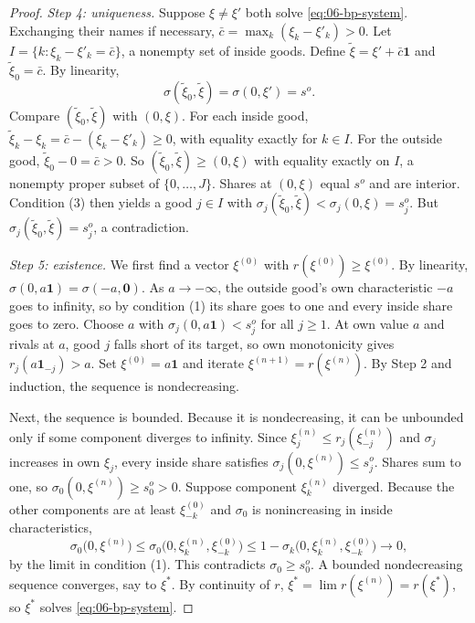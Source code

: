 \begin{proof}
\emph{Step 4: uniqueness.} Suppose $\xi \ne \xi'$ both solve \eqref{eq:06-bp-system}. Exchanging their names if
necessary, $\bar c = \max_k (\xi_k - \xi'_k) > 0$. Let $I = \{k : \xi_k - \xi'_k = \bar c\}$, a nonempty set of inside goods.
Define $\tilde\xi = \xi' + \bar c\mathbf{1}$ and $\tilde\xi_0 = \bar c$. By linearity,
\begin{equation*}
  \sigma(\tilde\xi_0, \tilde\xi) = \sigma(0, \xi') = s^o .
\end{equation*}
Compare $(\tilde\xi_0, \tilde\xi)$ with $(0, \xi)$. For each inside good, $\tilde\xi_k - \xi_k = \bar c - (\xi_k - \xi'_k) \ge
0$, with equality exactly for $k \in I$. For the outside good, $\tilde\xi_0 - 0 = \bar c > 0$. So $(\tilde\xi_0, \tilde\xi) \ge
(0, \xi)$ with equality exactly on $I$, a nonempty proper subset of $\{0, \dots, J\}$. Shares at $(0, \xi)$ equal $s^o$ and are
interior. Condition (3) then yields a good $j \in I$ with $\sigma_j(\tilde\xi_0, \tilde\xi) < \sigma_j(0, \xi) = s^o_j$. But
$\sigma_j(\tilde\xi_0, \tilde\xi) = s^o_j$, a contradiction.

\emph{Step 5: existence.} We first find a vector $\xi^{(0)}$ with $r(\xi^{(0)}) \ge \xi^{(0)}$. By linearity,
$\sigma(0, a\mathbf{1}) = \sigma(-a, \mathbf{0})$. As $a \to -\infty$, the outside good's own characteristic $-a$ goes to
infinity, so by condition (1) its share goes to one and every inside share goes to zero. Choose $a$ with $\sigma_j(0,
a\mathbf{1}) < s^o_j$ for all $j \ge 1$. At own value $a$ and rivals at $a$, good $j$ falls short of its target, so own
monotonicity gives $r_j(a\mathbf{1}_{-j}) > a$. Set $\xi^{(0)} = a\mathbf{1}$ and iterate $\xi^{(n+1)} = r(\xi^{(n)})$. By
Step 2 and induction, the sequence is nondecreasing.

Next, the sequence is bounded. Because it is nondecreasing, it can be unbounded only if some component
diverges to infinity. Since $\xi^{(n)}_j \le r_j(\xi^{(n)}_{-j})$ and $\sigma_j$ increases in own $\xi_j$, every
inside share satisfies $\sigma_j(0, \xi^{(n)}) \le s^o_j$. Shares sum to one, so $\sigma_0(0, \xi^{(n)}) \ge s^o_0 > 0$.
Suppose component $\xi^{(n)}_k$ diverged. Because the other components are at least $\xi^{(0)}_{-k}$ and
$\sigma_0$ is nonincreasing in inside characteristics,
\begin{equation*}
  \sigma_0\bigl(0, \xi^{(n)}\bigr) \le \sigma_0\bigl(0, \xi^{(n)}_k, \xi^{(0)}_{-k}\bigr)
  \le 1 - \sigma_k\bigl(0, \xi^{(n)}_k, \xi^{(0)}_{-k}\bigr) \to 0 ,
\end{equation*}
by the limit in condition (1). This contradicts $\sigma_0 \ge s^o_0$. A bounded nondecreasing sequence converges, say to
$\xi^*$. By continuity of $r$, $\xi^* = \lim r(\xi^{(n)}) = r(\xi^*)$, so $\xi^*$ solves \eqref{eq:06-bp-system}.
\end{proof}

